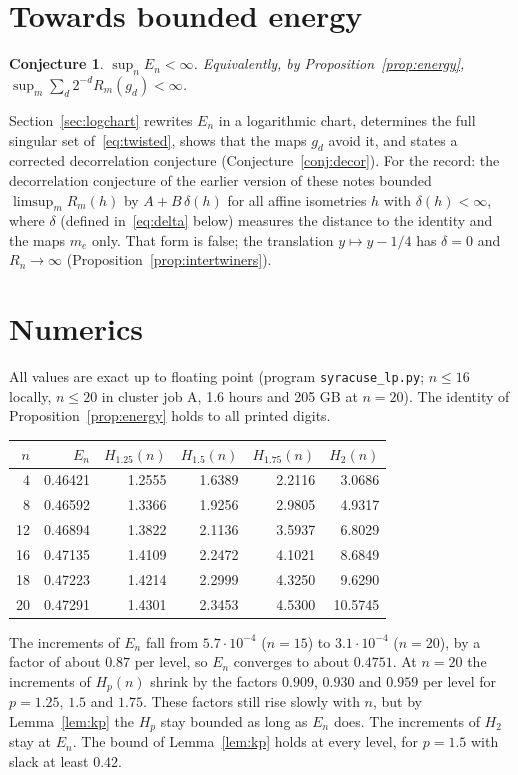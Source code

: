 \documentclass[11pt]{article}
\newtheorem{conjecture}[theorem]{Conjecture}
\theoremstyle{remark}
\begin{document}
\section{Towards bounded energy}
\begin{conjecture}\label{conj:energy}
$\sup_nE_n<\infty$. Equivalently, by Proposition~\ref{prop:energy}, $\sup_m\sum_{d}2^{-d}R_m(g_d)<\infty$.
\end{conjecture}

Section~\ref{sec:logchart} rewrites $E_n$ in a logarithmic chart, determines the full singular set of~\eqref{eq:twisted}, shows that the maps $g_d$ avoid it, and states a corrected decorrelation conjecture (Conjecture~\ref{conj:decor}). For the record: the decorrelation conjecture of the earlier version of these notes bounded $\limsup_mR_m(h)$ by $A+B\,\delta(h)$ for all affine isometries $h$ with $\delta(h)<\infty$, where $\delta$ (defined in~\eqref{eq:delta} below) measures the distance to the identity and the maps $m_e$ only. That form is false; the translation $y\mapsto y-1/4$ has $\delta=0$ and $R_n\to\infty$ (Proposition~\ref{prop:intertwiners}).

\section{Numerics}\label{sec:numerics}
All values are exact up to floating point (program \texttt{syracuse\_lp.py}; $n\le16$ locally, $n\le20$ in cluster job A, 1.6 hours and 205 GB at $n=20$). The identity of Proposition~\ref{prop:energy} holds to all printed digits.

\begin{center}
\begin{tabular}{@{}rrrrrr@{}}
\toprule
$n$ & $E_n$ & $H_{1.25}(n)$ & $H_{1.5}(n)$ & $H_{1.75}(n)$ & $H_2(n)$\\
\midrule
4 & 0.46421 & 1.2555 & 1.6389 & 2.2116 & 3.0686\\
8 & 0.46592 & 1.3366 & 1.9256 & 2.9805 & 4.9317\\
12 & 0.46894 & 1.3822 & 2.1136 & 3.5937 & 6.8029\\
16 & 0.47135 & 1.4109 & 2.2472 & 4.1021 & 8.6849\\
18 & 0.47223 & 1.4214 & 2.2999 & 4.3250 & 9.6290\\
20 & 0.47291 & 1.4301 & 2.3453 & 4.5300 & 10.5745\\
\bottomrule
\end{tabular}
\end{center}
The increments of $E_n$ fall from $5.7\cdot10^{-4}$ ($n=15$) to $3.1\cdot10^{-4}$ ($n=20$), by a factor of about $0.87$ per level, so $E_n$ converges to about $0.4751$. At $n=20$ the increments of $H_p(n)$ shrink by the factors $0.909$, $0.930$ and $0.959$ per level for $p=1.25$, $1.5$ and $1.75$. These factors still rise slowly with $n$, but by Lemma~\ref{lem:kp} the $H_p$ stay bounded as long as $E_n$ does. The increments of $H_2$ stay at $E_n$. The bound of Lemma~\ref{lem:kp} holds at every level, for $p=1.5$ with slack at least $0.42$.
\end{document}
